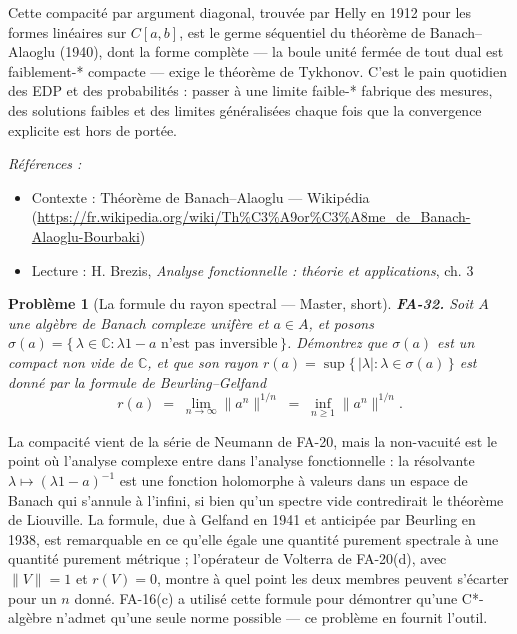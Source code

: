 \documentclass[11pt]{article}
\newtheorem{problem}{Problème}
\newenvironment{refs}{\par\small\noindent\emph{Références :}\begin{itemize}\setlength\itemsep{0pt}}{\end{itemize}\normalsize}
\begin{document}
\noindent Cette compacité par argument diagonal, trouvée par Helly en 1912 pour les formes
linéaires sur $ C[a,b] $, est le germe séquentiel du théorème de Banach--Alaoglu (1940), dont la forme
complète --- la boule unité fermée de tout dual est faiblement-* compacte --- exige le théorème de Tykhonov.
C'est le pain quotidien des EDP et des probabilités : \og{} passer à une limite faible-* \fg{} fabrique des
mesures, des solutions faibles et des limites généralisées chaque fois que la convergence explicite est
hors de portée.

\begin{refs}
\item Contexte : Théorème de Banach--Alaoglu --- Wikipédia (\url{https://fr.wikipedia.org/wiki/Th%C3%A9or%C3%A8me_de_Banach-Alaoglu-Bourbaki})
\item Lecture : H. Brezis, \textit{Analyse fonctionnelle : théorie et applications}, ch. 3
\end{refs}

\bigskip

\begin{problem}[{La formule du rayon spectral --- Master, short}]
\textbf{FA-32.} Soit $ A $ une algèbre de Banach complexe unifère et
$ a \in A $, et posons
$ \sigma(a) = \{\, \lambda \in \mathbb{C} : \lambda 1 - a \text{ n'est pas inversible} \,\} $.
Démontrez que $ \sigma(a) $ est un compact non vide de $ \mathbb{C} $, et que son rayon
$ r(a) = \sup\{\, |\lambda| : \lambda \in \sigma(a) \,\} $ est donné par la formule de
Beurling--Gelfand
\[ r(a) \;=\; \lim_{n \to \infty} \|a^n\|^{1/n} \;=\; \inf_{n \ge 1} \|a^n\|^{1/n} . \]
\end{problem}

\noindent La compacité vient de la série de Neumann de FA-20, mais la non-vacuité est le point où
l'analyse complexe entre dans l'analyse fonctionnelle : la résolvante
$ \lambda \mapsto (\lambda 1 - a)^{-1} $ est une fonction holomorphe à valeurs dans un espace de Banach
qui s'annule à l'infini, si bien qu'un spectre vide contredirait le théorème de Liouville. La formule, due
à Gelfand en 1941 et anticipée par Beurling en 1938, est remarquable en ce qu'elle égale une quantité
purement spectrale à une quantité purement métrique ; l'opérateur de Volterra de FA-20(d), avec
$ \|V\| = 1 $ et $ r(V) = 0 $, montre à quel point les deux membres peuvent s'écarter pour un $ n $
donné. FA-16(c) a utilisé cette formule pour démontrer qu'une C*-algèbre n'admet qu'une seule norme
possible --- ce problème en fournit l'outil.
\end{document}
